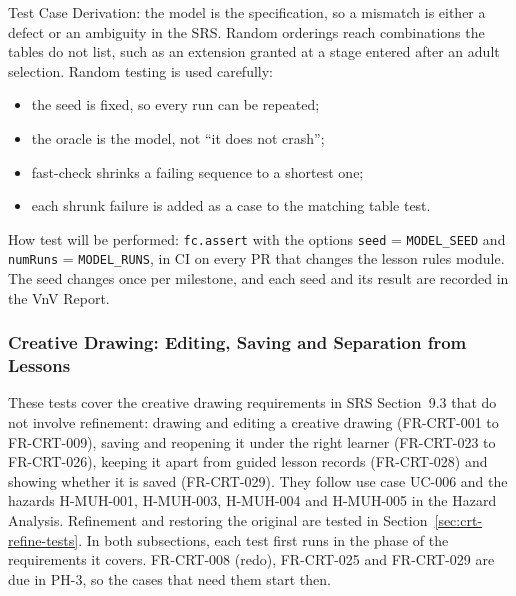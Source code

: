 \documentclass[12pt, titlepage]{article}
\begin{document}
\begin{enumerate}
Test Case Derivation: the model is the specification, so a mismatch is
either a defect or an ambiguity in the SRS. Random orderings reach
combinations the tables do not list, such as an extension granted at a
stage entered after an adult selection. Random testing is used carefully:
\begin{itemize}
\item the seed is fixed, so every run can be repeated;
\item the oracle is the model, not ``it does not crash'';
\item fast-check shrinks a failing sequence to a shortest one;
\item each shrunk failure is added as a case to the matching table test.
\end{itemize}

How test will be performed: \texttt{fc.assert} with the options
\texttt{seed} = \texttt{MODEL\_SEED} and \texttt{numRuns} =
\texttt{MODEL\_RUNS}, in CI on every PR
that changes the lesson rules module. The seed changes once per milestone,
and each seed and its result are recorded in the VnV Report.

\end{enumerate}

\subsubsection{Creative Drawing: Editing, Saving and Separation from Lessons}
\label{sec:crt-edit-tests}

These tests cover the creative drawing requirements in SRS Section~9.3 that do
not involve refinement: drawing and editing a creative drawing (FR-CRT-001 to
FR-CRT-009), saving and reopening it under the right learner (FR-CRT-023 to
FR-CRT-026), keeping it apart from guided lesson records (FR-CRT-028) and
showing whether it is saved (FR-CRT-029). They follow use case UC-006 and the
hazards H-MUH-001, H-MUH-003, H-MUH-004 and H-MUH-005 in the Hazard Analysis.
Refinement and restoring the original are tested in
Section~\ref{sec:crt-refine-tests}. In both subsections, each test first runs in
the phase of the requirements it covers. FR-CRT-008 (redo), FR-CRT-025 and
FR-CRT-029 are due in PH-3, so the cases that need them start then.
\end{document}
